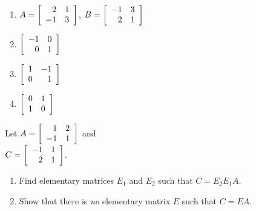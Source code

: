 \begin{multicols}{2}
\begin{ex}
\begin{enumerate}[label={\alph*.}]
\item $A = \left[ \begin{array}{rr}
2 & 1 \\
-1 & 3
\end{array} \right]$, 
$B = \left[ \begin{array}{rr}
-1 & 3 \\
2 & 1
\end{array} \right]$

\end{enumerate}
\begin{sol}
\begin{enumerate}[label={\alph*.}]
\setcounter{enumi}{1}
\item $\left[ \begin{array}{rr}
-1 & 0 \\
0 & 1
\end{array} \right]$

\setcounter{enumi}{3}
\item $\left[ \begin{array}{rr}
1 & -1 \\
0 & 1
\end{array} \right]$

\setcounter{enumi}{5}
\item $\left[ \begin{array}{rr}
0 & 1 \\
1 & 0
\end{array} \right]$

\end{enumerate}
\end{sol}
\end{ex}

\begin{ex}
Let $A = \left[ \begin{array}{rr}
1 & 2 \\
-1 & 1
\end{array} \right]$
 and \\ $C = \left[ \begin{array}{rr}
 -1 & 1 \\
 2 & 1
 \end{array} \right]$.

\begin{enumerate}[label={\alph*.}]
\item Find elementary matrices $E_{1}$ and $E_{2}$ such that $C = E_{2}E_{1}A$.

\item Show that there is \textit{no} elementary matrix $E$ such that $C = EA$.


\end{enumerate}
\end{ex}
\end{multicols}
